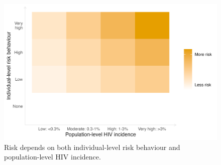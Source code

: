 \documentclass[a4paper, nobind]{templates/ociamthesis}
\begin{document}
\begin{figure}

{\centering \includegraphics[width=0.95\linewidth]{figures/risk-grid} 

}

\caption{Risk depends on both individual-level risk behaviour and population-level HIV incidence.}\label{fig:risk-grid}
\end{figure}
\end{document}
